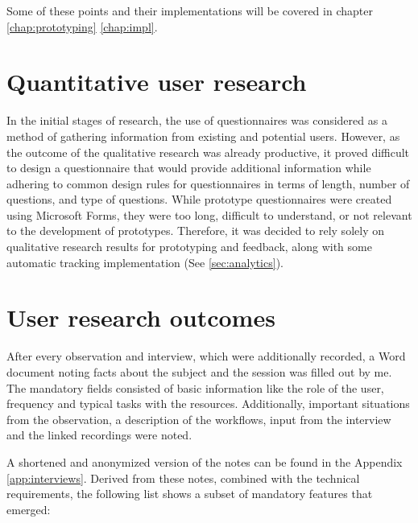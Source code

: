 Some of these points and their implementations will be covered in chapter \ref*{chap:prototyping} \ref*{chap:impl}.

\section{Quantitative user research}

In the initial stages of research, the use of questionnaires was considered as a method of gathering information from existing and potential users.
However, as the outcome of the qualitative research was already productive, it proved difficult to design a questionnaire that would provide additional information while adhering to common design rules for questionnaires in terms of length, number of questions, and type of questions.
While prototype questionnaires were created using Microsoft Forms, they were too long, difficult to understand, or not relevant to the development of prototypes.
Therefore, it was decided to rely solely on qualitative research results for prototyping and feedback, along with some automatic tracking implementation (See \ref{sec:analytics}).
\\
\section{User research outcomes}

After every observation and interview, which were additionally recorded, a Word document noting facts about the subject and the session was filled out by me.
The mandatory fields consisted of basic information like the role of the user, frequency and typical tasks with the resources.
Additionally, important situations from the observation, a description of the workflows, input from the interview and the linked recordings were noted.

A shortened and anonymized version of the notes can be found in the Appendix \ref{app:interviews}.
Derived from these notes, combined with the technical requirements, the following list shows a subset of mandatory features that emerged:

